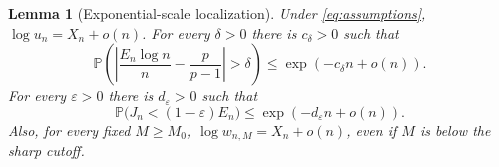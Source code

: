 \documentclass[11pt,a4paper]{article}
\numberwithin{equation}{section}
\newtheorem{lemma}[theorem]{Lemma}
\theoremstyle{definition}
\theoremstyle{remark}
\newcommand{\Prob}{\mathbb P}\newcommand{\E}{\mathbb E}
\begin{document}
\begin{lemma}[Exponential-scale localization]
\label{lem:macro}
Under \eqref{eq:assumptions}, $\log u_n=X_n+o(n)$. For every
$\delta>0$ there is $c_\delta>0$ such that
\begin{equation}
 \Prob\!\left(\left|\frac{E_n\log n}{n}-\frac p{p-1}\right|>\delta\right)
 \le\exp(-c_\delta n+o(n)).
 \label{eq:macro-excess}
\end{equation}
For every $\varepsilon>0$ there is $d_\varepsilon>0$ such that
\begin{equation}
 \Prob\bigl(J_n<(1-\varepsilon)E_n\bigr)
 \le\exp(-d_\varepsilon n+o(n)).
 \label{eq:macro-giant}
\end{equation}
Also, for every fixed $M\ge M_0$,
$\log w_{n,M}=X_n+o(n)$, even if $M$ is below the sharp cutoff.
\end{lemma}
\end{document}
